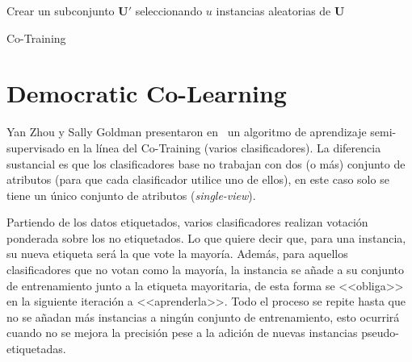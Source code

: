 \begin{algorithm}
    \DontPrintSemicolon
    Crear un subconjunto $\pmb{U'}$ seleccionando $u$ instancias aleatorias de $\pmb{U}$\;
     \caption{Co-Training}\label{pseudo:co-training}
\end{algorithm}

\clearpage
\section{Democratic Co-Learning}

Yan Zhou y Sally Goldman presentaron en~\cite{zhou2004democratic} un algoritmo
de aprendizaje semi-supervisado en la línea del Co-Training (varios
clasificadores). La diferencia sustancial es que los clasificadores base no
trabajan con dos (o más) conjunto de atributos (para que cada clasificador
utilice uno de ellos), en este caso solo se tiene un único conjunto de atributos
(\emph{single-view}).

Partiendo de los datos etiquetados, varios clasificadores realizan votación
ponderada sobre los no etiquetados. Lo que quiere decir que, para una instancia,
su nueva etiqueta será la que vote la mayoría. Además, para aquellos
clasificadores que no votan como la mayoría, la instancia se añade a su conjunto
de entrenamiento junto a la etiqueta mayoritaria, de esta forma se <<obliga>> en
la siguiente iteración a <<aprenderla>>. Todo el proceso se repite hasta que no
se añadan más instancias a ningún conjunto de entrenamiento, esto ocurrirá
cuando no se mejora la precisión pese a la adición de nuevas instancias
pseudo-etiquetadas.

